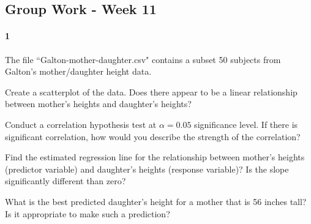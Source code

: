 \documentclass{article}
\begin{document}
\begin{flushleft}
\section*{Group Work - Week 11}
\paragraph{1} The file ``Galton-mother-daughter.csv" contains a subset 50 subjects from Galton's mother/daughter height data.
\begin{enumalpha}
\item Create a scatterplot of the data. Does there appear to be a linear relationship between mother's heights and daughter's heights?
\vspace{1.75in}
\item Conduct a correlation hypothesis test at $\alpha = 0.05$ significance level. If there is significant correlation, how would you describe the strength of the correlation?
\vspace{1.75in}
\item Find the estimated regression line for the relationship between mother's heights (predictor variable) and daughter's heights (response variable)? Is the slope significantly different than zero?
\vspace{1.75in}
\item What is the best predicted daughter's height for a mother that is 56 inches tall? Is it appropriate to make such a prediction?
\end{enumalpha}




\newpage

\end{flushleft}
\end{document}

